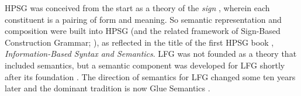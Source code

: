 HPSG  was conceived from the
start as  a theory of the \textit{sign} \citep{Saussure16a-Fr}, 
wherein each constituent is a pairing of form and meaning.  
So semantic representation and composition  were built into HPSG (and the 
related framework of Sign-Based Construction Grammar;
 \citealt{BS2012a-ed}), as reflected in the title of the first HPSG
book \citep{pollard;sag87}, \textit{Information-Based Syntax and
  Semantics}.  LFG was not founded as a theory that included semantics, but a semantic component was developed for LFG shortly after its foundation \citep{halvorsen83}.  The direction of semantics for LFG changed some ten years later and the dominant tradition is now Glue Semantics \citep{dalrymple;ea93,dalrymple99,Dalrymple2001a-u,asudeh-lpr,dalrymple;ea19}.  

